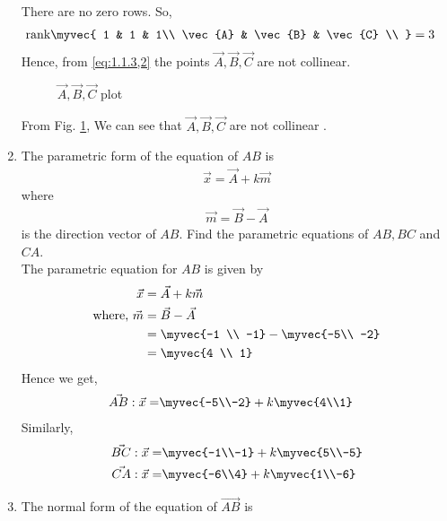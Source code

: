 \documentclass[11pt]{book}
\begin{document}
\begin{enumerate}[label=\thesection.\arabic*.,ref=\thesection.\theenumi]
There are no zero rows. So,
\begin{align}
    \text{rank}\myvec{
    1 & 1 & 1\\
    \vec{A} & \vec{B} & \vec{C} \\
    } &= 3 
\end{align}  
Hence, from \eqref{eq:1.1.3,2} the points $\vec{A},\vec{B},\vec{C}$ are not collinear. 
\begin{figure}[H]
\caption{$\vec{A},\vec{B},\vec{C}$ plot}
\label{fig1:Triangle}
\end{figure}
From Fig. \ref{fig1:Triangle}, We can see that $\vec{A},\vec{B},\vec{C}$ are not collinear .
\item The parametric form of the equation of $AB$ is
	\begin{align}
		\vec{x}=\vec{A}+k\vec{m}
	\end{align}
	where\\
	\begin{align}
		\vec{m} = \vec{B} - \vec{A}
	\end{align}
	is the direction vector of $AB$.
	Find the parametric equations of $AB,BC$ and $CA$.
        \solution\\
	The parametric equation for $AB$ is given by
	\begin{align}
		\vec{x} &= \vec{A} + k\vec{m}\\
		\text{where, } \vec{m} &= \vec{B} -\vec{A}\\
		&= \myvec{-1 \\ -1} -\myvec{-5\\ -2}\\
		&= \myvec{4 \\ 1}
	\end{align}
	Hence we get,
	\begin{align}
		\vec{AB}: \vec{x} = &\myvec{-5\\-2} + k \myvec{4\\1}
	\end{align}
	Similarly, 
	\begin{align}
		\vec{BC}: \vec{x} = &\myvec{-1\\-1} + k \myvec{5\\-5}\\
		\vec{CA}: \vec{x} = &\myvec{-6\\4} + k \myvec{1\\-6}
	\end{align}
\item The normal form of the equation of $\vec{AB}$ is

\end{enumerate}
\end{document}
